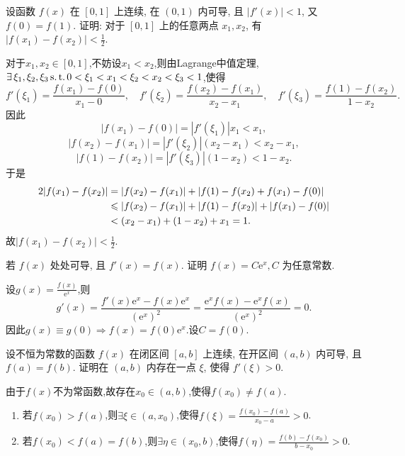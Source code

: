 \begin{exercise}[3.3.7]
    设函数 $f(x)$ 在 $[0,1]$ 上连续, 在 $(0,1)$ 内可导, 且 $|f'(x)| < 1$, 又 $f(0)=f(1)$. 证明: 对于 $[0,1]$ 上的任意两点 $x_1, x_2$, 有 $|f(x_1)-f(x_2)| < \frac{1}{2}$.
\end{exercise}

\begin{solution}
    对于$x_1,x_2 \in [0,1]$,不妨设$x_1 < x_2$,则由Lagrange中值定理,$\exists \xi_1,\xi_2,\xi_3 \st 0 < \xi_1 < x_1 < \xi_2 < x_2 < \xi_3 < 1$,使得
    $$
        f'(\xi_1) = \frac{f(x_1)-f(0)}{x_1-0}, \quad f'(\xi_2) = \frac{f(x_2)-f(x_1)}{x_2-x_1}, \quad f'(\xi_3) = \frac{f(1)-f(x_2)}{1-x_2}.
    $$
    因此$$|f(x_1)-f(0)| = |f'(\xi_1)|x_1 < x_1,$$
    $$|f(x_2)-f(x_1)| = |f'(\xi_2)|(x_2-x_1) < x_2 - x_1,$$
    $$|f(1)-f(x_2)| = |f'(\xi_3)|(1-x_2) < 1 - x_2.$$
    于是\begin{align*}
        2|f(x_1)-f(x_2)| & = |f(x_2)-f(x_1)| + |f(1)-f(x_2) + f(x_1)-f(0)|      \\
                         & \leqslant |f(x_2)-f(x_1)| + |f(1)-f(x_2)| + |f(x_1)-f(0)| \\
                         & < (x_2 - x_1) + (1 - x_2) + x_1 = 1.
    \end{align*}
    故$|f(x_1)-f(x_2)| < \frac{1}{2}$.
\end{solution}

\begin{exercise}[3.3.8]
    若 $f(x)$ 处处可导, 且 $f'(x)=f(x)$. 证明 $f(x) = C\mathrm{e}^x, C$ 为任意常数.
\end{exercise}

\begin{solution}
    设$g(x) = \frac{f(x)}{\mathrm{e}^x}$,则
    $$
        g'(x) = \frac{f'(x)\mathrm{e}^x - f(x)\mathrm{e}^x}{(\mathrm{e}^x)^2} = \frac{\mathrm{e}^x f(x) - \mathrm{e}^x f(x)}{(\mathrm{e}^x)^2} = 0.
    $$
    因此$g(x) \equiv g(0) \Rightarrow f(x) = f(0)\mathrm{e}^x$.设$C = f(0)$.
\end{solution}

\begin{exercise}[3.3.9]
    设不恒为常数的函数 $f(x)$ 在闭区间 $[a,b]$ 上连续, 在开区间 $(a,b)$ 内可导, 且 $f(a)=f(b)$. 证明在 $(a,b)$ 内存在一点 $\xi$, 使得 $f'(\xi)>0$.
\end{exercise}

\begin{solution}
    由于$f(x)$不为常函数,故存在$x_0 \in (a,b)$,使得$f(x_0) \ne f(a)$.
    \begin{enumerate}
        \item 若$f(x_0) > f(a)$,则$\exists \xi \in (a,x_0)$,使得$f(\xi) = \frac{f(x_0)-f(a)}{x_0-a} > 0$.
        \item 若$f(x_0) < f(a)=f(b)$,则$\exists \eta \in (x_0,b)$,使得$f(\eta) = \frac{f(b)-f(x_0)}{b-x_0} > 0$.
    \end{enumerate}
\end{solution}


